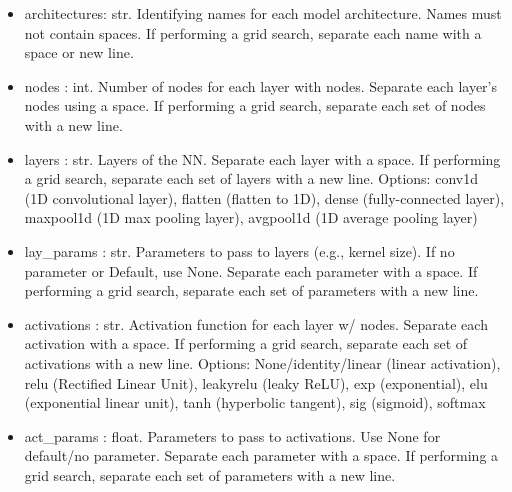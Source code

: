 \documentclass[letterpaper, 12pt]{article}
\begin{document}
\begin{itemize}
\item architectures: str. Identifying names for each model architecture.
                          Names must not contain spaces.
                          If performing a grid search, separate each name with 
                          a space or new line.
\item nodes        : int. Number of nodes for each layer with nodes.
                          Separate each layer's nodes using a space.
                          If performing a grid search, separate each set of 
                          nodes with a new line.
\item layers       : str. Layers of the NN. Separate each layer with a space. 
                          If performing a grid search, separate each set of 
                          layers with a new line.
                          Options: conv1d (1D convolutional layer), 
                                   flatten (flatten to 1D), 
                                   dense (fully-connected layer), 
                                   maxpool1d (1D max pooling layer), 
                                   avgpool1d (1D average pooling layer)
\item lay\_params  : str. Parameters to pass to layers (e.g., kernel size).
                          If no parameter or Default, use None.
                          Separate each parameter with a space.
                          If performing a grid search, separate each set of 
                          parameters with a new line.
\item activations  : str. Activation function for each layer w/ nodes.
                          Separate each activation with a space.
                          If performing a grid search, separate each set of 
                          activations with a new line.
                          Options: None/identity/linear (linear activation), 
                                   relu (Rectified Linear Unit), 
                                   leakyrelu (leaky ReLU), 
                                   exp (exponential), 
                                   elu (exponential linear unit), 
                                   tanh (hyperbolic tangent), 
                                   sig (sigmoid), 
                                   softmax
\item act\_params  : float. Parameters to pass to activations. 
                            Use None for default/no parameter.
                            Separate each parameter with a space.
                            If performing a grid search, separate each set of 
                            parameters with a new line.


\end{itemize}
\end{document}
